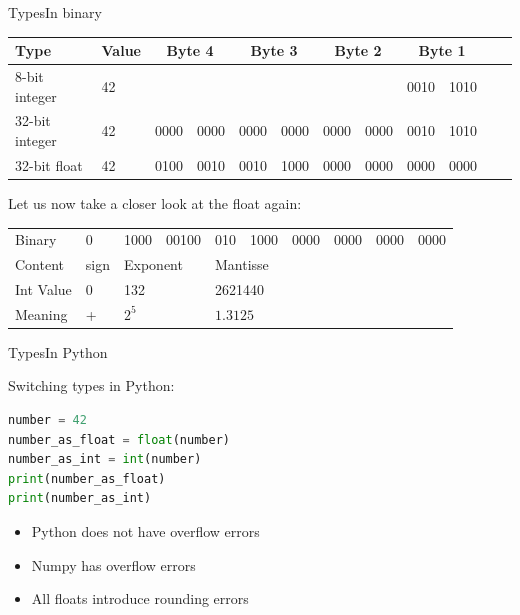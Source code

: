 \documentclass[aspectratio=169]{beamer}
\begin{document}
\begin{frame}{Types}{In binary}
\begin{tabular}{
	ll
	ll
	ll
	ll
	ll
	ll
}
	\toprule
	Type & Value
	&\multicolumn{2}{c}{Byte 4}
	&\multicolumn{2}{c}{Byte 3}
	&\multicolumn{2}{c}{Byte 2}
	&\multicolumn{2}{c}{Byte 1}\\
	\midrule
	8-bit integer & 42
	&&
	&&
	&&
	& 0010 & 1010 \\
	32-bit integer & 42
	& 0000 & 0000
	& 0000 & 0000
	& 0000 & 0000
	& 0010 & 1010 \\
	32-bit float & 42 
	& 0100 & 0010
	& 0010 & 1000
	& 0000 & 0000
	& 0000 & 0000 \\
	\bottomrule
\end{tabular}

\pause
\vspace{2em}
Let us now take a closer look at the float again:
\vspace{1em}

\begin{tabular}{
	l
	lll
	ll
	ll
	ll
}
	\toprule
	Binary
	& 0 
	& 1000 & 00100
	& 010 & 1000
	& 0000 & 0000
	& 0000 & 0000 \\
	\pause
	Content
	& sign  
	&\multicolumn{2}{l}{Exponent}
	&\multicolumn{6}{l}{Mantisse} \\
	\pause
	Int Value 
	& 0
	&\multicolumn{2}{l}{132}
	&\multicolumn{6}{l}{2621440}\\
	\pause
	Meaning
	& +
	& \multicolumn{2}{l}{\begin{math} 2^{5}\end{math}}
	& \multicolumn{6}{l}{\begin{math} 1.3125 \end{math}} \\
	\bottomrule
\end{tabular}
\end{frame}

\begin{frame}[fragile]{Types}{In Python}

Switching types in Python:

\begin{lstlisting}[language=Python, frame=single]
number = 42
number_as_float = float(number)
number_as_int = int(number)
print(number_as_float)
print(number_as_int)
\end{lstlisting}

\pause
\vspace{2em}
\begin{itemize}
	\item Python does not have overflow errors
	\item Numpy has overflow errors
	\item All floats introduce rounding errors
\end{itemize}

\end{frame}
\end{document}
